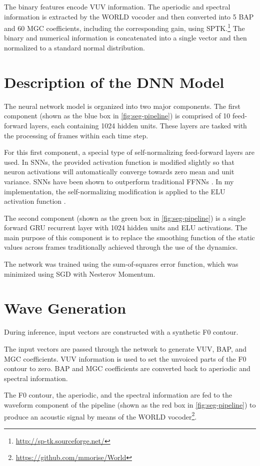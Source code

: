 The binary features encode \ac{VUV} information.
The aperiodic and spectral information is extracted by the WORLD vocoder and then converted into 5 \ac{BAP} and 60 \ac{MGC} coefficients, including the corresponding gain, using \ac{SPTK}.\footnote{\url{http://sp-tk.sourceforge.net/}}
The binary and numerical information is concatenated into a single vector and then normalized to a standard normal distribution.


\section{Description of the DNN Model}

The neural network model is organized into two major components.
The first component (shown as the blue box in \autoref{fig:seg-pipeline}) is comprised of 10 feed-forward layers, each containing 1024 hidden units.
These layers are tasked with the processing of frames within each time step.

For this first component, a special type of self-normalizing feed-forward layers are used.
In \acp{SNN}, the provided activation function is modified slightly so that neuron activations will automatically converge towards zero mean and unit variance.
\acp{SNN} have been shown to outperform traditional \acp{FFNN} \citep{Klambauer2017Self}.
In my implementation, the self-normalizing modification is applied to the ELU activation function \citep{Clevert2015Fast}.

The second component (shown as the green box in \autoref{fig:seg-pipeline}) is a single forward \ac{GRU} recurrent layer with 1024 hidden units and ELU activations.
The main purpose of this component is to replace the smoothing function of the static values across frames traditionally achieved through the use of the dynamics.

The network was trained using the sum-of-squares error function, which was minimized using \ac{SGD} with Nesterov Momentum.

\section{Wave Generation}

During inference, input vectors are constructed with a synthetic \ac{F0} contour.

The input vectors are passed through the network to generate \ac{VUV}, \ac{BAP}, and \ac{MGC} coefficients.
\ac{VUV} information is used to set the unvoiced parts of the \ac{F0} contour to zero.
\ac{BAP} and \ac{MGC} coefficients are converted back to aperiodic and spectral information.

The \ac{F0} contour, the aperiodic, and the spectral information are fed to the waveform component of the pipeline (shown as the red box in \autoref{fig:seg-pipeline}) to produce an acoustic signal by means of the WORLD vocoder\footnote{\url{https://github.com/mmorise/World}}.
